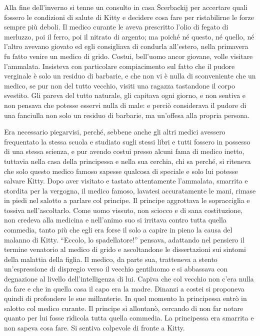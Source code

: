 \label{parte-seconda} 
\pagestyle{pagina}

\label{i-1} 

Alla fine dell'inverno si tenne un consulto in casa Šcerbackij per accertare quali fossero le condizioni di salute di Kitty e decidere cosa fare per ristabilirne le forze sempre più deboli. Il medico curante le aveva prescritto l'olio di fegato di merluzzo, poi il ferro, poi il nitrato di argento; ma poiché né questo, né quello, né l'altro avevano giovato ed egli consigliava di condurla all'estero, nella primavera fu fatto venire un medico di grido. Costui, bell'uomo ancor giovane, volle visitare l'ammalata. Insisteva con particolare compiacimento sul fatto che il pudore verginale è solo un residuo di barbarie, e che non vi è nulla di sconveniente che un medico, se pur non del tutto vecchio, visiti una ragazza tastandone il corpo svestito. Gli pareva del tutto naturale, gli capitava ogni giorno, e non sentiva e non pensava che potesse esservi nulla di male: e perciò considerava il pudore di una fanciulla non solo un residuo di barbarie, ma un'offesa alla propria persona. 

Era necessario piegarvisi, perché, sebbene anche gli altri medici avessero frequentato la stessa scuola e studiato sugli stessi libri e tutti fossero in possesso di una stessa scienza, e pur avendo costui presso alcuni fama di medico inetto, tuttavia nella casa della principessa e nella sua cerchia, chi sa perché, si riteneva che solo questo medico famoso sapesse qualcosa di speciale e solo lui potesse salvare Kitty. Dopo aver visitato e tastato attentamente l'ammalata, smarrita e stordita per la vergogna, il medico famoso, lavatesi accuratamente le mani, rimase in piedi nel salotto a parlare col principe. Il principe aggrottava le sopracciglia e tossiva nell'ascoltarlo. Come uomo vissuto, non sciocco e di sana costituzione, non credeva alla medicina e nell'animo suo si irritava contro tutta quella commedia, tanto più che egli era forse il solo a capire in pieno la causa del malanno di Kitty. ``Eccolo, lo spadellatore!'' pensava, adattando nel pensiero il termine venatorio al medico di grido e ascoltandone le dissertazioni sui sintomi della malattia della figlia. Il medico, da parte sua, tratteneva a stento un'espressione di dispregio verso il vecchio gentiluomo e si abbassava con degnazione al livello dell'intelligenza di lui. Capiva che col vecchio non c'era nulla da fare e che in quella casa il capo era la madre. Dinanzi a costei si proponeva quindi di profondere le sue millanterie. In quel momento la principessa entrò in salotto col medico curante. Il principe si allontanò, cercando di non far notare quanto per lui fosse ridicola tutta quella commedia. La principessa era smarrita e non sapeva cosa fare. Si sentiva colpevole di fronte a Kitty. 

